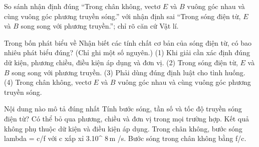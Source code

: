 \begin{bt}
So sánh nhận định đúng “Trong chân không, vectơ $E$ và $B$ vuông góc nhau và cùng vuông góc phương truyền sóng.” với nhận định sai “Trong sóng điện từ, $E$ và $B$ song song với phương truyền.”; chỉ rõ căn cứ Vật lí.
\end{bt}

\begin{ex}
Trong bốn phát biểu về Nhận biết các tính chất cơ bản của sóng điện từ, có bao nhiêu phát biểu đúng? (Chỉ ghi một số nguyên.) (1) Khi giải cần xác định đúng dữ kiện, phương chiều, điều kiện áp dụng và đơn vị. (2) Trong sóng điện từ, $E$ và $B$ song song với phương truyền. (3) Phải dùng đúng định luật cho tình huống. (4) Trong chân không, vectơ $E$ và $B$ vuông góc nhau và cùng vuông góc phương truyền sóng.
\end{ex}

\begin{ex}
Nội dung nào mô tả đúng nhất Tính bước sóng, tần số và tốc độ truyền sóng điện từ?
\choice
{Có thể bỏ qua phương, chiều và đơn vị trong mọi trường hợp.}
{Kết quả không phụ thuộc dữ kiện và điều kiện áp dụng.}
{\True Trong chân không, bước sóng lambda = c/f với c xấp xỉ 3.10^ $8\,\text{m}$ /s.}
{Bước sóng trong chân không bằng f/c.}
\end{ex}

